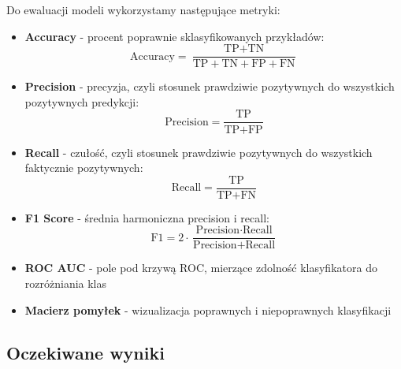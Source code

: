 \documentclass[11pt,a4paper]{article}
\begin{document}
Do ewaluacji modeli wykorzystamy następujące metryki:
\begin{itemize}
    \item \textbf{Accuracy} - procent poprawnie sklasyfikowanych przykładów:
    \begin{equation}
    \text{Accuracy} = \frac{\text{TP} + \text{TN}}{\text{TP} + \text{TN} + \text{FP} + \text{FN}}
    \end{equation}

    \item \textbf{Precision} - precyzja, czyli stosunek prawdziwie pozytywnych do wszystkich pozytywnych predykcji:
    \begin{equation}
    \text{Precision} = \frac{\text{TP}}{\text{TP} + \text{FP}}
    \end{equation}

    \item \textbf{Recall} - czułość, czyli stosunek prawdziwie pozytywnych do wszystkich faktycznie pozytywnych:
    \begin{equation}
    \text{Recall} = \frac{\text{TP}}{\text{TP} + \text{FN}}
    \end{equation}

    \item \textbf{F1 Score} - średnia harmoniczna precision i recall:
    \begin{equation}
    \text{F1} = 2 \cdot \frac{\text{Precision} \cdot \text{Recall}}{\text{Precision} + \text{Recall}}
    \end{equation}

    \item \textbf{ROC AUC} - pole pod krzywą ROC, mierzące zdolność klasyfikatora do rozróżniania klas
    \item \textbf{Macierz pomyłek} - wizualizacja poprawnych i niepoprawnych klasyfikacji
\end{itemize}


\subsection{Oczekiwane wyniki}
\end{document}
